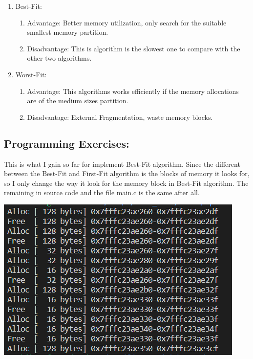 \documentclass[a4paper, 11pt]{article}
\begin{document}
\begin{enumerate}
\begin{enumerate}
        \item Best-Fit:
        \begin{enumerate}
            \item Advantage: Better memory utilization, only search for the suitable smallest memory partition.
            \item Disadvantage: This is algorithm is the slowest one to compare with the other two algorithms.  
        \end{enumerate}

        \item Worst-Fit:
        \begin{enumerate}
            \item Advantage: This algorithms works efficiently if the memory allocations are of the medium sizes partition.
            \item Disadvantage: External Fragmentation, waste memory blocks.
        \end{enumerate}
    \end{enumerate}
\end{enumerate}

\subsection{Programming Exercises: }

\par{This is what I gain so far for implement Best-Fit algorithm. Since the different between the Best-Fit and First-Fit algorithm is the blocks of memory it looks for, so I only change the way it look for the memory block in Best-Fit algorithm. The remaining in source code and the file main.c is the same after all.}

\bigbreak
\includegraphics[scale = 0.7]{result.png}
\end{document}
